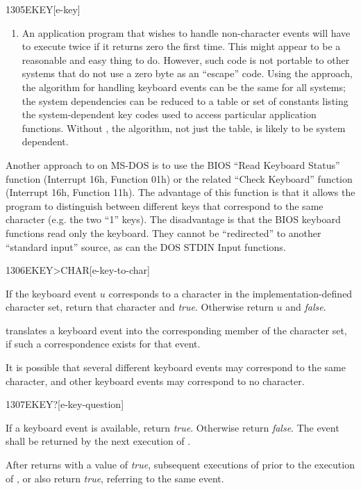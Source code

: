 \begin{newword}{1305}{EKEY}[e-key]
\begin{rationale}
\begin{enumerate}
		\item An application program that wishes to handle non-character
			events will have to execute  twice if it
			returns zero the first time. This might appear to be a
			reasonable and easy thing to do. However, such code is not
			portable to other systems that do not use a zero byte as an
			``escape'' code. Using the  approach, the
			algorithm for handling keyboard events can be the same for
			all systems; the system dependencies can be reduced to a
			table or set of constants listing the system-dependent key
			codes used to access particular application functions.
			Without , the algorithm, not just the table, is
			likely to be system dependent.
		\end{enumerate}

		Another approach to  on MS-DOS is to use the BIOS
		``Read Keyboard Status'' function (Interrupt 16h, Function 01h)
		or the related ``Check Keyboard'' function (Interrupt 16h,
		Function 11h). The advantage of this function is that it allows
		the program to distinguish between different keys that correspond
		to the same character (e.g. the two ``1'' keys). The disadvantage
		is that the BIOS keyboard functions read only the keyboard. They
		cannot be ``redirected'' to another ``standard input'' source,
		as can the DOS STDIN Input functions.
	\end{rationale}
\end{newword}


\begin{newword}[EKEYtoCHAR]{1306}{EKEY>CHAR}[e-key-to-char]

	If the keyboard event $u$ corresponds to a character in the
	implementation-defined character set, return that character and
	\emph{true}. Otherwise return $u$ and \emph{false}.

	\begin{rationale} %
		 translates a keyboard event into the
		corresponding member of the character set, if such a
		correspondence exists for that event.

		It is possible that several different keyboard events may
		correspond to the same character, and other keyboard events
		may correspond to no character.
	\end{rationale}
\end{newword}


\begin{newword}{1307}{EKEY?}[e-key-question]

	If a keyboard event is available, return \emph{true}. Otherwise
	return \emph{false}. The event shall be returned by the next
	execution of .

	After  returns with a value of \emph{true},
	subsequent executions of  prior to the execution of
	,  or  also return
	\emph{true}, referring to the same event.
\end{newword}


